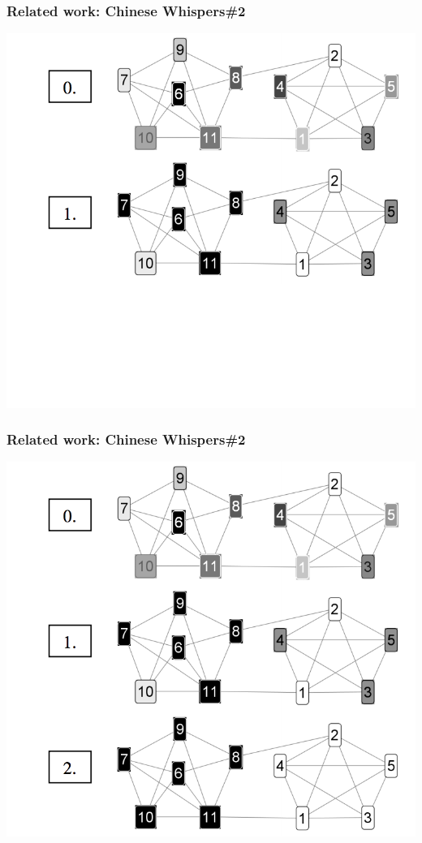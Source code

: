 \documentclass{beamer}
\begin{document}
\begin{frame}[fragile]
\frametitle{Related work: Chinese Whispers\#2}
\begin{center}
 \includegraphics[height=0.59\textwidth]{cw2-2}
 
 \end{center}
\end{frame}

\begin{frame}[fragile]
\frametitle{Related work: Chinese Whispers\#2}
\begin{center}
 \includegraphics[height=0.59\textwidth]{cw2}
 
 \end{center}
\end{frame}
\end{document}
